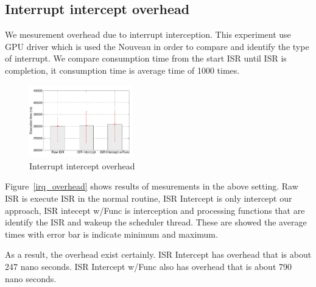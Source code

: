 \subsection{Interrupt intercept overhead}
We mesurement overhead due to interrupt interception.
This experiment use GPU driver which is used the Nouveau in order to compare and identify the type of interrupt.
We compare consumption time from the start ISR until ISR is completion, it consumption time is average time of 1000 times.



\begin{figure}[t]
\begin{center}
\includegraphics[width=0.4\textwidth]{img/interrupt.pdf}
\caption{Interrupt intercept overhead}
\end{center}
\label{fig:irq_overhead}
\end{figure}

Figure~\ref{irq_overhead} shows results of mesurements in the above setting.
Raw ISR is execute ISR in the normal routine, ISR Intercept is only intercept our approach,
ISR intecept w/Func is interception and processing functions that are identify the ISR and wakeup the scheduler thread.
These are showed the average times with error bar is indicate minimum and maximum.

As a result, the overhead exist certainly.
ISR Intercept has overhead that is about 247 nano seconds.
ISR Intercept w/Func also has overhead that is about 790 nano seconds.

